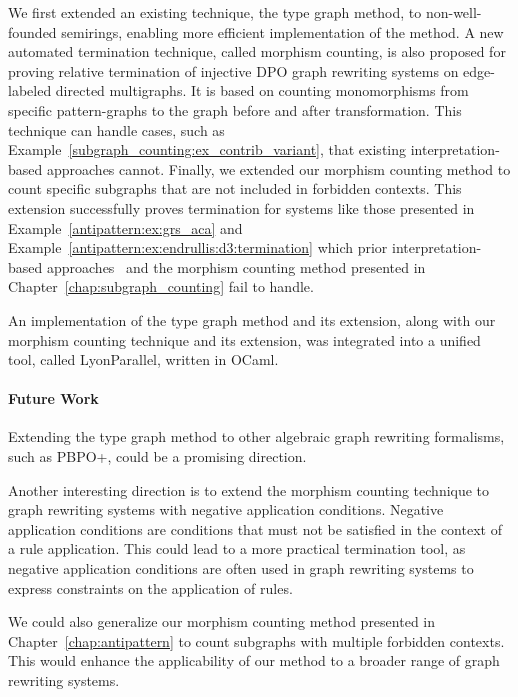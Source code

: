 \documentclass{report}
\begin{document}
We first extended an existing technique, the type graph method, to non-well-founded semirings, enabling more efficient implementation of the method.
A new automated termination technique, called morphism counting, is also proposed for proving relative termination of injective DPO graph rewriting systems on edge-labeled directed multigraphs. It is based on counting monomorphisms from specific pattern-graphs to the graph before and after transformation. This technique can handle cases, such as Example~\ref{subgraph_counting:ex_contrib_variant}, that existing interpretation-based approaches cannot.
Finally, we extended our morphism counting method to count specific subgraphs that are not included in forbidden contexts. This extension successfully proves termination for systems like those presented
in Example~\ref{antipattern:ex:grs_aca} and Example~\ref{antipattern:ex:endrullis:d3:termination} which prior interpretation-based approaches~\cite{zantema2014termination,bruggink2014termination,bruggink2015proving,endrullis2024generalized_arxiv_v2,overbeek2024termination_lmcs} and the morphism counting method presented in Chapter~\ref{chap:subgraph_counting} fail to handle.

An implementation of the type graph method and its extension, along with our morphism counting technique and its extension, was integrated into a unified tool, called LyonParallel, written in OCaml.
 
\paragraph{Future Work}

Extending the type graph method to other algebraic graph rewriting formalisms, such as PBPO+, could be a promising direction.

Another interesting direction is to extend the morphism counting technique to graph rewriting systems with negative application conditions. Negative application conditions are conditions that must not be satisfied in the context of a rule application. This could lead to a more practical termination tool, as negative application conditions are often used in graph rewriting systems to express constraints on the application of rules.

We could also generalize our morphism counting method presented in Chapter~\ref{chap:antipattern} to count subgraphs with multiple forbidden contexts. This would enhance the applicability of our method to a broader range of graph rewriting systems.
\end{document}
